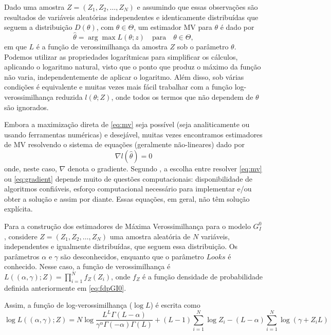 \documentclass[12pt]{article}
\begin{document}
Dado uma amostra $Z = (Z_1, Z_2, \dots, Z_N)$ e assumindo que essas observações são resultados de variáveis aleatórias independentes e identicamente distribuídas que seguem a distribuição $D(\theta)$, com $\theta \in \Theta$, um estimador MV para $\theta$ é dado por
\begin{equation}
    \hat{\theta} = \arg\max L(\theta; z) \quad \text{para} \quad \theta \in \Theta, \label{eq:mv}
\end{equation}
em que $L$ é a função de verossimilhança da amostra $Z$ sob o parâmetro $\theta$. Podemos utilizar as propriedades logarítmicas para simplificar os cálculos, aplicando o logaritmo natural, visto que o ponto que produz o máximo da função não varia, independentemente de aplicar o logaritmo. Além disso, sob várias condições é equivalente e muitas vezes mais fácil trabalhar com a função log-verossimilhança reduzida $l(\theta; Z)$, onde todos os termos que não dependem de $\theta$ são ignorados.

Embora a maximização direta de \eqref{eq:mv} seja possível (seja analiticamente ou usando ferramentas numéricas) e desejável, muitas vezes encontramos estimadores de MV resolvendo o sistema de equações (geralmente não-lineares) dado por
\begin{equation}
    \nabla l(\hat{\theta}) = 0 \label{eq:gradient} 
\end{equation}
onde, neste caso, $\nabla$ denota o gradiente. Segundo \citet{FreryMinute2004}, a escolha entre resolver \eqref{eq:mv} ou \eqref{eq:gradient} depende muito de questões computacionais: disponibilidade de algoritmos confiáveis, esforço computacional necessário para implementar e/ou obter a solução e assim por diante. Essas equações, em geral, não têm solução explícita.

Para a construção dos estimadores de Máxima Verossimilhança para o modelo $G_I^0$, considere $Z = (Z_1, Z_2, \dots, Z_N)$ uma amostra aleatória de $N$ variáveis, independentes e igualmente distribuídas, que seguem essa distribuição. Os parâmetros $\alpha$ e $\gamma$ são desconhecidos, enquanto que o parâmetro $Looks$ é conhecido. Nesse caso, a função de verossimilhança é $L((\alpha, \gamma); Z) = \prod_{i=1}^{N} f_Z(Z_i)$, onde $f_Z$ é a função densidade de probabilidade definida anteriormente em \eqref{eq:fdpGI0}. 

Assim, a função de log-verossimilhança ($\log L$) é escrita como
\begin{equation}
    \log L((\alpha, \gamma); Z) = N\log \frac{L^{L}\Gamma(L-\alpha)}{\gamma^{\alpha}\Gamma(-\alpha)\Gamma(L)} +  (L-1)\sum_{i=1}^{N}\log Z_i - (L-\alpha)\sum_{i=1}^{N}\log (\gamma + Z_iL) \label{eq:logVer}
\end{equation}
\end{document}
